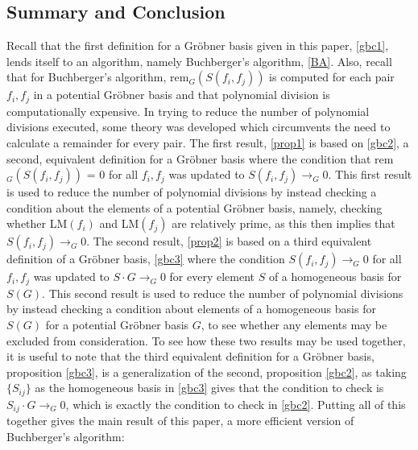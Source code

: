 \documentclass[reqno]{amsart}
\theoremstyle{definition}
\theoremstyle{definition}
\begin{document}
\subsection{Summary and Conclusion}

Recall that the first definition for a Gr{\"o}bner basis given in this paper, \ref{gbc1}, lends itself to an algorithm, namely Buchberger's algorithm, \ref{BA}. Also, recall that for Buchberger's algorithm, rem$_G(S(f_i,f_j))$ is computed for each pair $f_i,f_j$ in a potential Gr{\"o}bner basis and that polynomial division is computationally expensive. In trying to reduce the number of polynomial divisions executed, some theory was developed which circumvents the need to calculate a remainder for every pair. The first result, \ref{prop1} is based on \ref{gbc2}, a second, equivalent definition for a Gr{\"o}bner basis where the condition that rem$_G(S(f_i,f_j))$ = 0 for all $f_i,f_j$ was updated to $S(f_i,f_j) \rightarrow_G 0$. This first result is used to reduce the number of polynomial divisions by instead checking a condition about the elements of a potential Gr{\"o}bner basis, namely, checking whether LM$(f_i)$ and LM$(f_j)$ are relatively prime, as this then implies that $S(f_i,f_j) \rightarrow_G 0$. The second result, \ref{prop2} is based on a third equivalent definition of a Gr{\"o}bner basis, \ref{gbc3} where the condition $S(f_i,f_j) \rightarrow_G 0$ for all $f_i,f_j$ was updated to $S\cdot G \rightarrow_G 0$ for every element $S$ of a homogeneous basis for $S(G)$. This second result is used to reduce the number of polynomial divisions by instead checking a condition about elements of a homogeneous basis for $S(G)$ for a potential Gr{\"o}bner basis $G$, to see whether any elements may be excluded from consideration. To see how these two results may be used together, it is useful to note that the third equivalent definition for a Gr{\"o}bner basis, proposition \ref{gbc3}, is a generalization of the second, proposition \ref{gbc2}, as taking $\{S_{ij}\}$ as the homogeneous basis in \ref{gbc3} gives that the condition to check is $S_{ij}\cdot G \rightarrow_G 0$, which is exactly the condition to check in \ref{gbc2}. Putting all of this together gives the main result of this paper, a more efficient version of Buchberger's algorithm: 
\end{document}
